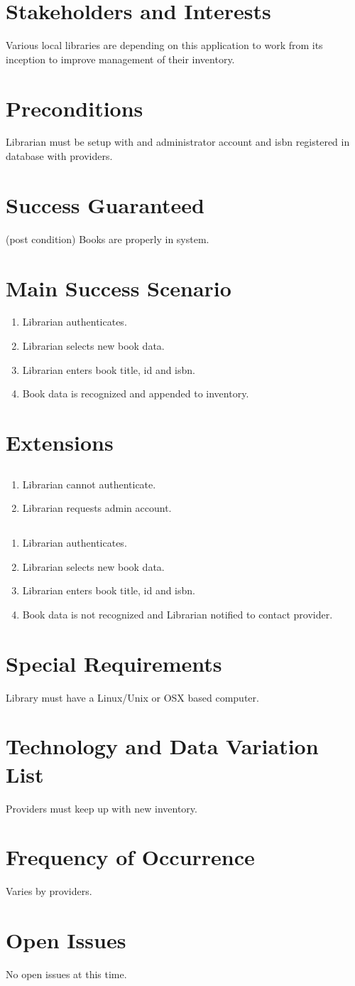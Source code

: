 \documentclass[11pt,a4paper]{article}
\begin{document}
\section{Stakeholders and Interests}
Various local libraries are depending on this application to work from its inception to improve management of their inventory.
\section{Preconditions}
Librarian must be setup with and administrator account and isbn registered in database with providers.
\section{Success Guaranteed}
(post condition) Books are properly in system. 
\section{Main Success Scenario}
\begin{enumerate}
\item Librarian authenticates.
\item Librarian selects new book data.
\item Librarian enters book title, id and isbn.
\item Book data is recognized and appended to inventory.
\end{enumerate}
\section{Extensions}
\subsection{}
\begin{enumerate}
\item Librarian cannot authenticate.
\item Librarian requests admin account.
\end{enumerate}
\subsection{}
\begin{enumerate}
\item Librarian authenticates.
\item Librarian selects new book data.
\item Librarian enters book title, id and isbn.
\item Book data is not recognized and Librarian notified to contact provider.
\end{enumerate}
\section{Special Requirements}
Library must have a Linux/Unix or OSX based computer.
\section{Technology and Data Variation List}
Providers must keep up with new inventory.
\section{Frequency of Occurrence}
Varies by providers.
\section{Open Issues}
No open issues at this time.
\end{document}

